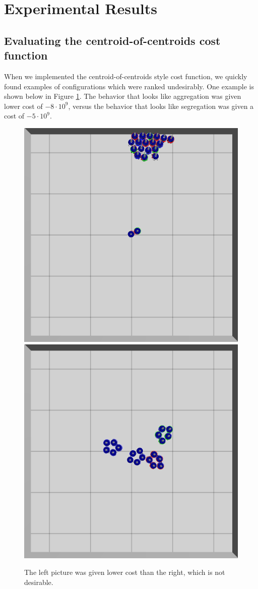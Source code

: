 \documentclass[conference]{IEEEtran}
\begin{document}
\section{Experimental Results}

  \subsection{Evaluating the centroid-of-centroids cost function} \label{section:evaluting_cost_functions}

    When we implemented the centroid-of-centroids style cost function, we quickly found examples of configurations which were ranked undesirably. One example is shown below in Figure \ref{fig:cost_function_fuckup}. The behavior that looks like aggregation was given lower cost of $-8\cdot 10^{9}$, versus the behavior that looks like segregation was given a cost of $-5\cdot 10^{9}$.

    \begin{figure}[H]
      \centering
      \includegraphics[width=0.49\linewidth]{./images/individual_0_gen_0.png}
      \includegraphics[width=0.49\linewidth]{./images/individual_0_gen_1_better.png}
      \caption{The left picture was given lower cost than the right, which is not desirable.}
      \label{fig:cost_function_fuckup}
    \end{figure}
\end{document}
